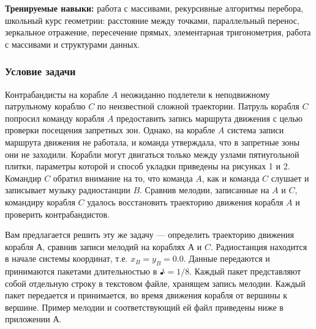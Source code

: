 
\textbf{Тренируемые навыки: }работа с массивами, рекурсивные алгоритмы перебора, школьный курс геометрии: расстояние между точками, параллельный перенос, зеркальное отражение, пересечение прямых, элементарная тригонометрия, работа с массивами и структурами данных.
\subsubsection*{Условие задачи}

Контрабандисты на корабле $A$ неожиданно подлетели к неподвижному патрульному кораблю $C$ по неизвестной сложной траектории. Патруль корабля $C$ попросил команду корабля $A$ предоставить запись маршрута движения с целью проверки посещения запретных зон. Однако, на корабле $A$ система записи маршрута движения не работала, и команда утверждала, что в запретные зоны они не заходили. Корабли могут двигаться только между узлами пятиугольной плитки, параметры которой и способ укладки приведены на рисунках 1 и 2. Командир $C$ обратил внимание на то, что команда $A$, как и команда $C$ слушает и записывает музыку радиостанции $B$. Сравнив мелодии, записанные на $A$ и $C$, командиру корабля $C$ удалось восстановить траекторию движения корабля $A$ и проверить контрабандистов.

Вам предлагается решить эту же задачу — определить траекторию движения корабля $А$, сравнив записи мелодий на кораблях $А$ и $C$. Радиостанция находится в начале системы координат, т.е. $x_B=y_B=0.0$. Данные передаются и принимаются пакетами длительностью в ♪$=1/8$. Каждый пакет представляют собой отдельную строку в текстовом файле, хранящем запись мелодии. Каждый пакет передается и принимается, во время движения корабля от вершины к вершине. Пример мелодии и соответствующий ей файл приведены ниже в приложении А.


